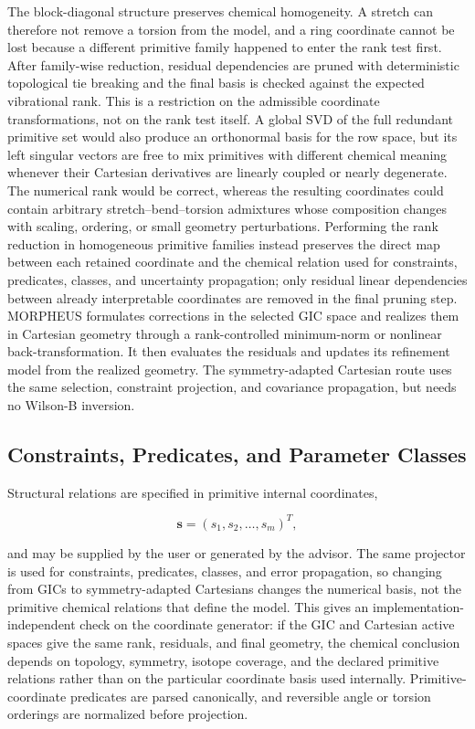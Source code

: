 \documentclass[aip,jcp,reprint,longbibliography,floatfix]{revtex4-2}
\begin{document}
The block-diagonal structure preserves chemical homogeneity. A stretch can
therefore not remove a torsion from the model, and a ring coordinate cannot be
lost because a different primitive family happened to enter the rank test
first. After family-wise reduction, residual dependencies are pruned with
deterministic topological tie breaking and the final basis is checked against
the expected vibrational rank.
This is a restriction on the admissible coordinate transformations, not on the
rank test itself. A global SVD of the full redundant primitive set would also
produce an orthonormal basis for the row space, but its left singular vectors
are free to mix primitives with different chemical meaning whenever their
Cartesian derivatives are linearly coupled or nearly degenerate. The numerical
rank would be correct, whereas the resulting coordinates could contain
arbitrary stretch--bend--torsion admixtures whose composition changes with
scaling, ordering, or small geometry perturbations. Performing the rank
reduction in homogeneous primitive families instead preserves the direct map
between each retained coordinate and the chemical relation used for
constraints, predicates, classes, and uncertainty propagation; only residual
linear dependencies between already interpretable coordinates are removed in
the final pruning step.
MORPHEUS formulates corrections in the selected GIC space and realizes them in
Cartesian geometry through a rank-controlled minimum-norm or nonlinear
back-transformation. It then evaluates the residuals and updates its
refinement model from the realized geometry. The symmetry-adapted Cartesian route uses
the same selection, constraint projection, and covariance propagation, but
needs no Wilson-B inversion.


\subsection{Constraints, Predicates, and Parameter Classes}

Structural relations are specified in primitive internal coordinates,

\begin{equation}
\mathbf{s} = (s_1,s_2,\ldots,s_m)^T ,
\end{equation}

and may be supplied by the user or generated by the advisor. The same
projector is used for constraints, predicates, classes, and error propagation,
so changing from GICs to symmetry-adapted Cartesians changes the numerical
basis, not the primitive chemical relations that define the model.
This gives an implementation-independent check on the coordinate generator:
if the GIC and Cartesian active spaces give the same rank, residuals, and final
geometry, the chemical conclusion depends on topology, symmetry, isotope
coverage, and the declared primitive relations rather than on the particular
coordinate basis used internally.
Primitive-coordinate predicates are parsed canonically, and reversible
angle or torsion orderings are normalized before projection.
\end{document}
